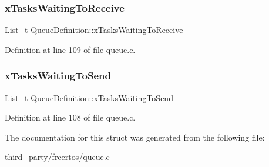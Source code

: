 \subsubsection{\texorpdfstring{x\+Tasks\+Waiting\+To\+Receive}{xTasksWaitingToReceive}}
{\footnotesize\ttfamily \hyperlink{list_8h_afd590ef6400071b4d63d65ef90bea7f4}{List\+\_\+t} Queue\+Definition\+::x\+Tasks\+Waiting\+To\+Receive}



Definition at line 109 of file queue.\+c.

\mbox{\label{structQueueDefinition_aaab135c4345cb0393d6ff3cd5164c7b2}} 
\subsubsection{\texorpdfstring{x\+Tasks\+Waiting\+To\+Send}{xTasksWaitingToSend}}
{\footnotesize\ttfamily \hyperlink{list_8h_afd590ef6400071b4d63d65ef90bea7f4}{List\+\_\+t} Queue\+Definition\+::x\+Tasks\+Waiting\+To\+Send}



Definition at line 108 of file queue.\+c.



The documentation for this struct was generated from the following file\+:\begin{DoxyCompactItemize}
\item 
third\+\_\+party/freertos/\hyperlink{queue_8c}{queue.\+c}\end{DoxyCompactItemize}
